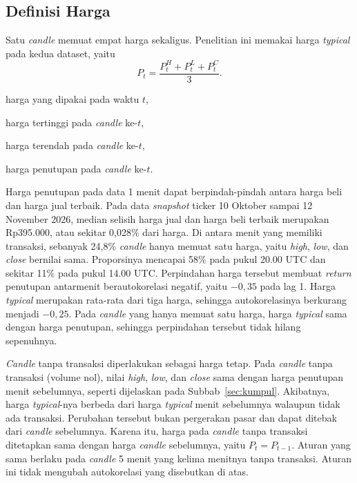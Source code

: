 \subsection{Definisi Harga}
Satu \textit{candle} memuat empat harga sekaligus. Penelitian ini memakai
harga \textit{typical} pada kedua dataset, yaitu
\begin{equation}
  P_t = \frac{P^{H}_t + P^{L}_t + P^{C}_t}{3} .
  \label{eq:typical}
\end{equation}
\begin{keterangan}
  \item[$P_t$] harga yang dipakai pada waktu $t$,
  \item[$P^{H}_t$] harga tertinggi pada \textit{candle} ke-$t$,
  \item[$P^{L}_t$] harga terendah pada \textit{candle} ke-$t$,
  \item[$P^{C}_t$] harga penutupan pada \textit{candle} ke-$t$.
\end{keterangan}
Harga penutupan pada data 1 menit dapat berpindah-pindah antara harga beli
dan harga jual terbaik. Pada data \textit{snapshot} ticker 10 Oktober sampai
12 November 2026, median selisih harga jual dan harga beli terbaik merupakan
Rp395.000, atau sekitar 0,028\% dari harga. Di antara menit yang memiliki
transaksi, sebanyak 24,8\% \textit{candle} hanya memuat satu harga, yaitu
\textit{high}, \textit{low}, dan \textit{close} bernilai sama. Proporsinya
mencapai 58\% pada pukul 20.00 UTC dan sekitar 11\% pada pukul 14.00 UTC. Perpindahan harga tersebut membuat
\textit{return} penutupan antarmenit berautokorelasi negatif, yaitu $-0{,}35$
pada lag 1. Harga \textit{typical} merupakan rata-rata dari tiga harga,
sehingga autokorelasinya berkurang menjadi $-0{,}25$. Pada \textit{candle} yang
hanya memuat satu harga, harga \textit{typical} sama dengan harga penutupan,
sehingga perpindahan tersebut tidak hilang sepenuhnya.

\textit{Candle} tanpa transaksi diperlakukan sebagai harga tetap. Pada
\textit{candle} tanpa transaksi (volume nol), nilai \textit{high}, \textit{low}, dan \textit{close} sama dengan
harga penutupan menit sebelumnya, seperti dijelaskan pada
Subbab~\ref{sec:kumpul}. Akibatnya, harga \textit{typical}-nya berbeda dari
harga \textit{typical} menit sebelumnya walaupun tidak ada transaksi. Perubahan
tersebut bukan pergerakan pasar dan dapat ditebak dari \textit{candle}
sebelumnya. Karena itu, harga pada \textit{candle} tanpa transaksi ditetapkan
sama dengan harga \textit{candle} sebelumnya, yaitu $P_t = P_{t-1}$. Aturan
yang sama berlaku pada \textit{candle} 5 menit yang kelima menitnya tanpa
transaksi. Aturan ini tidak mengubah
autokorelasi yang disebutkan di atas.

